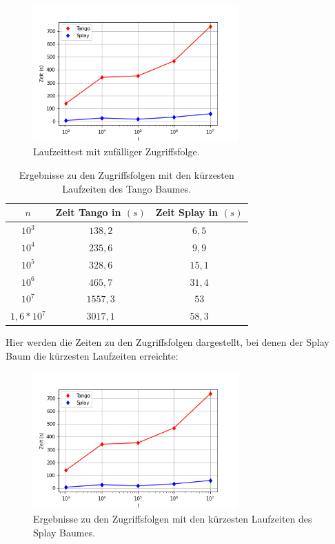 \documentclass[a4paper,12pt]{article}
\begin{document}
\begin{figure}[H]
	\centering
	\includegraphics[width=0.7\textwidth]{"Medien/laufzeittest/diagramm/randomaccess"}
	\caption{Laufzeittest mit zufälliger Zugriffsfolge.}
 	
\end{figure}
\begin{table}[H]
	\begin{center}
		\begin{tabular}[c]{|c|c|c|}
			\hline
			$n$ & Zeit Tango in $\left(s\right)$ &Zeit Splay in $\left(s\right)$ \\
			\hline
			$10^3$ & $138,2$ &$6,5$ \\
			\hline
			$10^4$  & $235,6$ &$9,9$  \\
			\hline
			$10^5$  & $328,6$ &$15,1$  \\
			\hline
			$10^6$  & $465,7$ &$31,4$  \\
			\hline
			$10^7$  & $1557,3$ &$53$  \\
			\hline
			$1,6 * 10^7$  & $3017,1$ &$58,3$  \\
			\hline
		\end{tabular}
		\caption{Ergebnisse zu den Zugriffsfolgen mit den kürzesten Laufzeiten des Tango Baumes.} 
	\end{center}
\end{table}
\noindent	Hier werden die Zeiten zu den Zugriffsfolgen dargestellt, bei denen der Splay Baum die kürzesten  Laufzeiten erreichte:
\begin{figure}[H]
	\centering
	\includegraphics[width=0.7\textwidth]{"Medien/laufzeittest/diagramm/randomaccess"}
	\caption{Ergebnisse zu den Zugriffsfolgen mit den kürzesten Laufzeiten des Splay Baumes.}
	
\end{figure}
\end{document}

